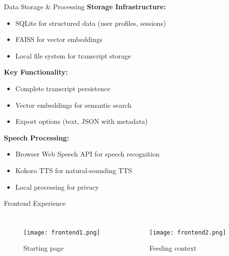 \documentclass{beamer}
\begin{document}
\begin{frame}{Data Storage \& Processing}
\scriptsize
\textbf{Storage Infrastructure:}
\begin{itemize}
    \item SQLite for structured data (user profiles, sessions)
    \item FAISS for vector embeddings
    \item Local file system for transcript storage
\end{itemize}

\vspace{4pt}

\textbf{Key Functionality:}
\begin{itemize}
    \item Complete transcript persistence
    \item Vector embeddings for semantic search
    \item Export options (text, JSON with metadata)
\end{itemize}

\vspace{4pt}

\textbf{Speech Processing:}
\begin{itemize}
    \item Browser Web Speech API for speech recognition
    \item Kokoro TTS for natural-sounding TTS
    \item Local processing for privacy
\end{itemize}
\end{frame}

\begin{frame}{Frontend Experience}
    \begin{columns}[T]
        \begin{figure}
            \texttt{[image: frontend1.png]}
            \caption{Starting page}
        \end{figure}
        
        \begin{figure}
            \texttt{[image: frontend2.png]}
            \caption{Feeding context}
        \end{figure}
    \end{columns}
\end{frame}
\end{document}
